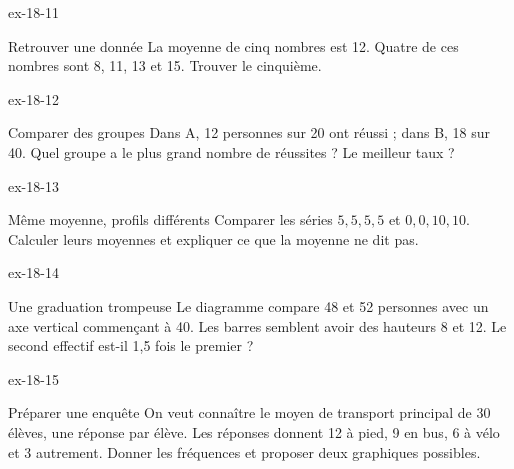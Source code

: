 \begin{blocLivre}{ex-18-11}\begin{exercice}[3]{Retrouver une donnée}
La moyenne de cinq nombres est 12. Quatre de ces nombres sont 8, 11, 13 et 15. Trouver le cinquième.
\end{exercice}\end{blocLivre}
\begin{blocLivre}{ex-18-12}\begin{exercice}[3]{Comparer des groupes}
Dans A, 12 personnes sur 20 ont réussi ; dans B, 18 sur 40. Quel groupe a le plus grand nombre de réussites ? Le meilleur taux ?
\end{exercice}\end{blocLivre}
\begin{blocLivre}{ex-18-13}\begin{exercice}[3]{Même moyenne, profils différents}
Comparer les séries $5,5,5,5$ et $0,0,10,10$. Calculer leurs moyennes et expliquer ce que la moyenne ne dit pas.
\end{exercice}\end{blocLivre}
\begin{blocLivre}{ex-18-14}\begin{exercice}[3]{Une graduation trompeuse}
Le diagramme compare 48 et 52 personnes avec un axe vertical commençant à 40. Les barres semblent avoir des hauteurs 8 et 12. Le second effectif est-il 1,5 fois le premier ?
\label{fig-ex-18-14}
\end{exercice}\end{blocLivre}
\begin{blocLivre}{ex-18-15}\begin{exercice}[3]{Préparer une enquête}
On veut connaître le moyen de transport principal de 30 élèves, une réponse par élève. Les réponses donnent 12 à pied, 9 en bus, 6 à vélo et 3 autrement. Donner les fréquences et proposer deux graphiques possibles.
\label{fig-ex-18-15}
\end{exercice}\end{blocLivre}

\clearpage
